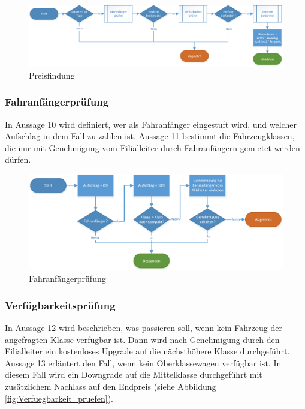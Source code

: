 \begin{figure}[tbh]
\centering
\includegraphics[width=1.0\linewidth]{Bilder/Preis_berechnen}
\caption{Preisfindung}
\label{fig:Preis_berechnen}
\end{figure}

\subsubsection{Fahranfängerprüfung}

In Aussage 10 wird definiert, wer als Fahranfänger eingestuft wird, und welcher Aufschlag in dem 
Fall zu zahlen ist. Aussage 11 bestimmt die Fahrzeugklassen, die nur mit Genehmigung vom Filialleiter
durch Fahranfängern gemietet werden dürfen.

\begin{figure}[H]
\centering
\includegraphics[width=1.0\linewidth]{Bilder/Fahranfaenger_pruefen}
\caption{Fahranfängerprüfung}
\label{fig:Fahranfänger_prüfen}
\end{figure}

\subsubsection{Verfügbarkeitsprüfung}

In Aussage 12 wird beschrieben, was passieren soll, wenn kein Fahrzeug der angefragten Klasse
verfügbar ist. Dann wird nach Genehmigung durch den Filialleiter ein kostenloses Upgrade 
auf die nächsthöhere Klasse durchgeführt. 
Aussage 13 erläutert den Fall, wenn kein Oberklassewagen verfügbar ist. In diesem Fall wird
ein Downgrade auf die Mittelklasse durchgeführt mit zusätzlichem Nachlass auf den Endpreis (siehe Abbildung \ref{fig:Verfuegbarkeit_pruefen}).

